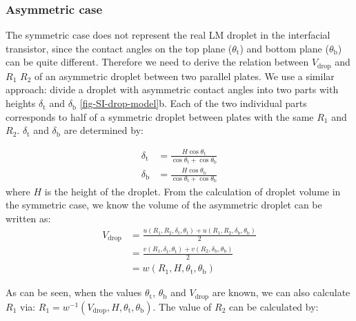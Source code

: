 \subsubsection{Asymmetric case}
\label{sec:small-orgba3824f}
The symmetric case does not represent the real LM droplet in the
interfacial transistor, since the contact angles on the top plane
(\(\theta_{\mathrm{t}}\)) and bottom plane (\(\theta_{\mathrm{b}}\))
can be quite different. Therefore we need to derive the relation
between \(V_{\mathrm{drop}}\) and \(R_{1}\) \(R_{2}\) of an asymmetric
droplet between two parallel plates. We use a similar approach:
divide a droplet with asymmetric contact angles into two parts with
heights \(\delta_{\mathrm{t}}\) and \(\delta_{\mathrm{b}}\)
\autoref{fig-SI-drop-model}b. Each of the two individual parts
corresponds to half of a symmetric droplet between plates with the
same \(R_{1}\) and \(R_{2}\). \(\delta_{\mathrm{t}}\) and
\(\delta_{\mathrm{b}}\) are determined by:

\begin{eqnarray}
\label{eq:small-deltas-1}
\delta_{\mathrm{t}} &= {\displaystyle \frac{H \cos \theta_{\mathrm{t}}}{\cos \theta_{\mathrm{t}} 
                  + \cos \theta_{\mathrm{b}}}} \\
\label{eq:small-deltas-2}
\delta_{\mathrm{b}} &= {\displaystyle \frac{H \cos \theta_{\mathrm{b}}}{\cos \theta_{\mathrm{t}} 
                  + \cos \theta_{\mathrm{b}}}}
\end{eqnarray}
where \(H\) is the height of the droplet.
From the calculation of droplet volume in the symmetric case, we know
the volume of the asymmetric droplet can be written as:
\begin{equation}
\label{eq:small-V-assym-1}
\begin{aligned}
V_{\mathrm{drop}} &= \frac{u(R_{1}, R_{2}, \delta_{\mathrm{t}}, \theta_{\mathrm{t}}) + u(R_{1}, R_{2}, \delta_{\mathrm{b}}, \theta_{\mathrm{b}})}{2}\\
                  &= \frac{v(R_{1}, \delta_{\mathrm{t}}, \theta_{\mathrm{t}}) +
                           v(R_{2}, \delta_{\mathrm{b}}, \theta_{\mathrm{b}})}{2} \\
                  &= w(R_{1}, H, \theta_{\mathrm{t}}, \theta_{\mathrm{b}})
\end{aligned}
\end{equation}

As can be seen, when the values \(\theta_{\mathrm{t}}\),
\(\theta_{\mathrm{b}}\) and \(V_{\mathrm{drop}}\) are known, we can also
calculate \(R_{1}\) via: \(R_{1} = w^{-1}(V_{\mathrm{drop}}, H,
 \theta_{\mathrm{t}}, \theta_{\mathrm{b}})\). The value of \(R_{2}\) can
be calculated by:

